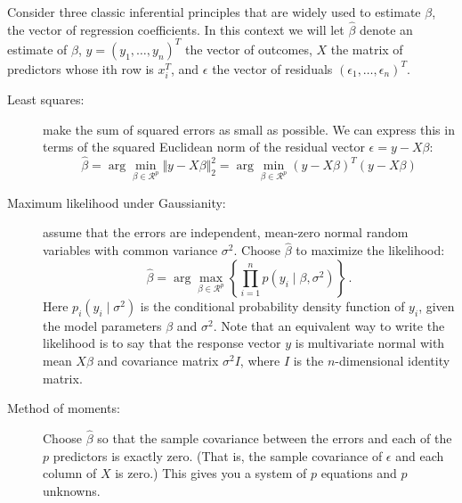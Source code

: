 \documentclass{mynotes}
\begin{document}
Consider three classic inferential principles that are widely used to estimate $\beta$, the vector of regression coefficients.  In this context we will let $\hat{\beta}$ denote an estimate of $\beta$, $y = (y_1, \ldots, y_n)^T$ the vector of outcomes, $X$ the matrix of predictors whose ith row is $x_i^T$, and $\epsilon$ the vector of residuals $(\epsilon_1, \ldots, \epsilon_n)^T$.  
 
\begin{description}
\item[Least squares:] make the sum of squared errors as small as possible.  We can express this in terms of the squared Euclidean norm of the residual vector $\epsilon = y - X \beta$:  
$$
\hat{\beta} = \arg \min_{\beta \in \mathcal{R}^p} \Vert y - X\beta \Vert_2^2 =  \arg \min_{\beta \in \mathcal{R}^p} (y - X\beta)^T (y-X \beta)
$$
\item[Maximum likelihood under Gaussianity:] assume that the errors are independent, mean-zero normal random variables with common variance $\sigma^2$.  Choose $\hat{\beta}$ to maximize the likelihood:
$$
\hat{\beta} = \arg \max_{\beta \in \mathcal{R}^p} \left\{ \prod_{i=1}^n p(y_i \mid \beta, \sigma^2) \right\} \, .
$$
Here $p_i(y_i \mid \sigma^2)$ is the conditional probability density function of $y_i$, given the model parameters $\beta$ and $\sigma^2$.  Note that an equivalent way to write the likelihood is to say that the response vector $y$ is multivariate normal with mean $X \beta$ and covariance matrix $\sigma^2 I$, where $I$ is the $n$-dimensional identity matrix.  

\item[Method of moments:] Choose $\hat{\beta}$ so that the sample covariance between the errors and each of the $p$ predictors is exactly zero.  (That is, the sample covariance of $\epsilon$ and each column of $X$ is zero.)  This gives you a system of $p$ equations and $p$ unknowns.
\end{description}
\end{document}
